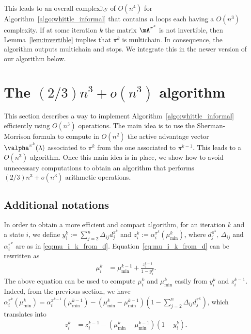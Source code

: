 This leads to an overall complexity of $O(n^4)$ for Algorithm~\ref{algo:whittle_informal} that contains $n$ loops each having a $O(n^3)$ complexity.
If at some iteration $k$ the matrix $\mA^{\pi^k}$ is not invertible, then Lemma~\ref{lem:invertible} implies that $\pi^k$ is multichain.
In consequence, the algorithm outputs multichain and stops.
We integrate this in the newer version of our algorithm below.

\section[The \texorpdfstring{$(2/3)S^3 + o(S^3)$}{2S3/3+o(S3)} algorithm]{The \texorpdfstring{$(2/3)n^3 + o(n^3)$}{2n3/3+o(n3)} algorithm}
\label{sec:formal_widx_algo}

This section describes a way to implement Algorithm~\ref{algo:whittle_informal}  efficiently using  $O(n^3)$ operations.
The main idea is to use the Sherman-Morrison formula to compute in $O(n^2)$ the active advantage vector $\valpha^{\pi^k}(\lambda)$ associated to $\pi^k$ from the one associated to $\pi^{k-1}$.
This leads to a $O(n^3)$ algorithm. Once this main idea is in place, we show how to avoid unnecessary computations to obtain an algorithm that performs $(2/3)n^3+o(n^3)$ arithmetic operations.

\subsection{Additional notations}

In order to obtain a more efficient and compact algorithm, for an iteration $k$ and a state $i$, we define $y^k_i:=\sum_{j=2}^n\Delta_{ij}d_j^{\pi^k}$ and $z^k_i:=\alpha^{\pi^k}_i(\mu^k_{\min})$, where $d_j^{\pi^k}$, $\Delta_{ij}$ and $\alpha^{\pi^k}_i$ are as in \eqref{eq:mu_i_k_from_d}.
Equation~\eqref{eq:mu_i_k_from_d} can be rewritten as
\begin{align}
    \mu_i^k &= \mu^{k-1}_{\min} +\displaystyle\frac{z_i^{k-1}}{1-y_i^k}.
    \label{eq:mu^k_i_from_y}
\end{align}
The above equation can be used to compute $\mu_i^k$ and $\mu^k_{\min}$ easily from $y^k_i$ and $z^{k-1}_i$. 
Indeed, from the previous section, we have $\alpha^{\pi^k}_i(\mu^k_{\min}) = \alpha^{\pi^{k-1}}_i(\mu^{k-1}_{\min}) -(\mu^k_{\min} -\mu^{k-1}_{\min})(1 -\sum_{j=2}^n\Delta_{ij}d_j^{\pi^k})$, which translates into
\begin{align}
    z^k_i &= z^{k-1}_i -(\mu^k_{\min} -\mu^{k-1}_{\min})(1 -y^k_i). \label{eq:z^k-i}
\end{align}

